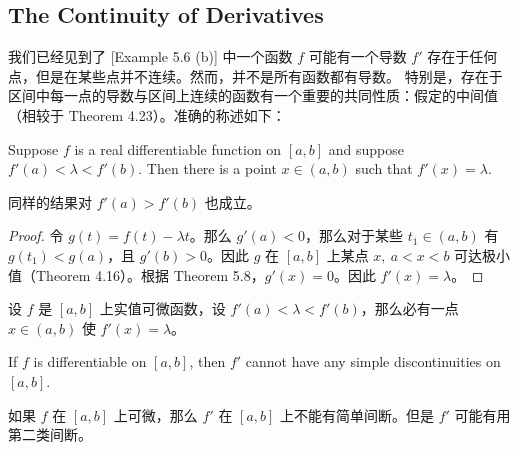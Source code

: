 \documentclass[../poma-notes.tex]{subfiles}
\begin{document}
\subsection*{The Continuity of Derivatives}

我们已经见到了 [Example 5.6 (b)] 中一个函数 $f$ 可能有一个导数 $f'$ 存在于任何点，但是在某些点并不连续。然而，并不是所有函数都有导数。
特别是，存在于区间中每一点的导数与区间上连续的函数有一个重要的共同性质：假定的中间值（相较于 Theorem 4.23）。准确的称述如下：

\begin{theorem}
  Suppose $f$ is a real differentiable function on $[a, b]$ and suppose $f'(a) < \lambda < f'(b)$. Then there is a
  point $x \in (a, b)$ such that $f'(x) = \lambda$.
\end{theorem}

同样的结果对 $f'(a) > f'(b)$ 也成立。

\begin{proof}
  令 $g(t) = f(t) - \lambda t$。那么 $g'(a) < 0$，那么对于某些 $t_1 \in (a,b)$ 有 $g(t_1) < g(a)$，且 $g'(b) > 0$。因此
  $g$ 在 $[a, b]$ 上某点 $x,\ a<x<b$ 可达极小值（Theorem 4.16）。根据 Theorem 5.8，$g'(x) = 0$。因此 $f'(x) = \lambda$。
\end{proof}

\begin{anote}
  设 $f$ 是 $[a, b]$ 上实值可微函数，设 $f'(a) < \lambda < f'(b)$，那么必有一点 $x \in (a, b)$ 使 $f'(x) = \lambda$。
\end{anote}

\begin{corollary}
  If $f$ is differentiable on $[a, b]$, then $f'$ cannot have any simple discontinuities on $[a, b]$.
\end{corollary}

\begin{anote}
  如果 $f$ 在 $[a, b]$ 上可微，那么 $f'$ 在 $[a, b]$ 上不能有简单间断。但是 $f'$ 可能有用第二类间断。
\end{anote}
\end{document}
